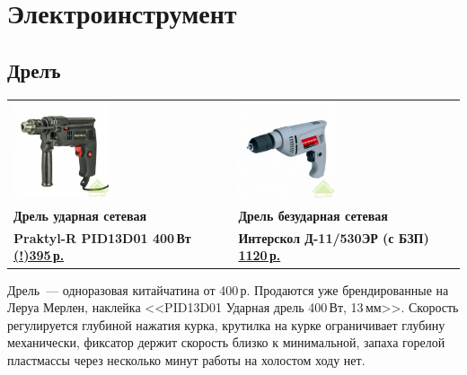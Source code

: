 \section{Электроинструмент}

\clearpage
\subsection{Дрелъ}

\noindent
\begin{tabular}{p{} p{}}
\noindent
\includegraphics[width=0.45\textwidth]{tech/tools/PraktylR.jpg}
&
\noindent
\includegraphics[width=0.45\textwidth]{tech/tools/D_11_530ER.jpg}
\\
\textbf{Дрель ударная сетевая} & \textbf{Дрель безударная сетевая} \\
\textbf{Praktyl-R PID13D01 400\,Вт} 
\href{http://leroymerlin.ru/catalogue/instrumenty/elektroinstrument/dreli\_udarnye/13805983/}{\textbf{(!)395\,р.}}
&
\textbf{Интерскол Д-11/530ЭР (с БЗП)}
\href{http://leroymerlin.ru/catalogue/instrumenty/elektroinstrument/dreli\_bezudarnye/11857763/}{\textbf{1120\,р.}}
\\
\end{tabular}
\bigskip

Дрель\ --- одноразовая китайчатина от 400\,р. Продаются уже брендированные на
Леруа Мерлен, наклейка <<PID13D01 Ударная дрель 400\,Вт, 13\,мм>>. Скорость
регулируется глубиной нажатия курка, крутилка на курке ограничивает глубину
механически, фиксатор держит скорость близко к минимальной, запаха горелой
пластмассы через несколько минут работы на холостом ходу нет.

